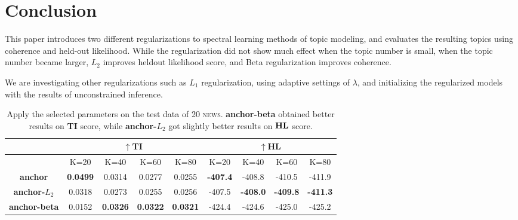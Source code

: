 \documentclass{article}
\begin{document}
\section{Conclusion}

This paper introduces two different regularizations to spectral learning methods of topic
modeling, and evaluates the resulting topics using coherence and held-out
likelihood.  While the regularization did not show much effect when the topic
number is small, when the topic number became larger, $L_2$ improves heldout
likelihood score, and Beta regularization improves coherence.

We are investigating other regularizations such as $L_1$ regularization, using adaptive
settings of $\lambda$, and initializing the regularized models with the results
of unconstrained inference.


\begin{table}[t]
   \begin{center}
   \begin{footnotesize}
       \begin{tabular}{|c|cccc||cccc|} \hline
       	  & \multicolumn{4}{c||}{$\uparrow${\bf TI}} & \multicolumn{4}{c|}{$\uparrow${\bf HL}}\\ \hline
           &K=20 &K=40 &K=60 &K=80 &K=20 &K=40 &K=60 &K=80\\ \hline
          {\bf anchor} &{\bf 0.0499} &0.0314 &0.0277 &0.0255    &{\bf -407.4} &-408.8 &-410.5 &-411.9  \\
          {\bf anchor-$L_2$} &0.0318 &0.0273 &0.0255 &0.0256    &-407.5 &{\bf -408.0} &{\bf -409.8} &{\bf -411.3} \\
          {\bf anchor-beta} &0.0152 &{\bf 0.0326} &{\bf 0.0322} &{\bf 0.0321}   &-424.4 &-424.6 &-425.0 &-425.2\\
          \hline
       \end{tabular}
       \caption{Apply the selected parameters on the test data of \textsc{20 news}. {\bf anchor-beta} obtained
       better results on {\bf TI} score, while {\bf anchor-$L_2$} got slightly better results on $\bf HL$ score.
       }
       \label{tab:results}
   \end{footnotesize}
   \end{center}
\end{table}








\footnotesize

\end{document}
